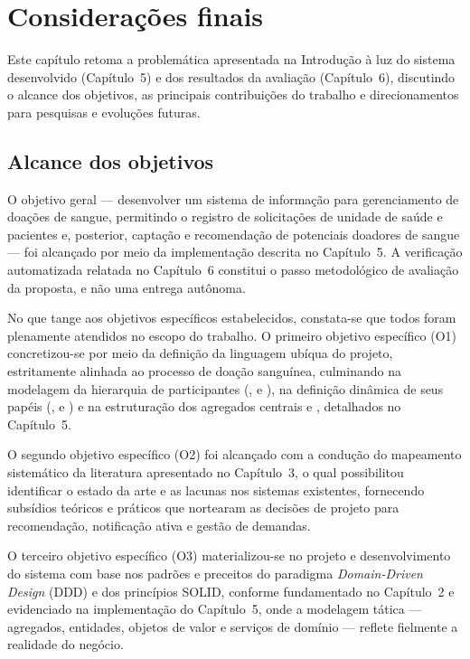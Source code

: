 \chapter{Considerações finais}

Este capítulo retoma a problemática apresentada na Introdução à luz do sistema desenvolvido (Capítulo~5) e dos resultados da avaliação (Capítulo~6), discutindo o alcance dos objetivos, as principais contribuições do trabalho e direcionamentos para pesquisas e evoluções futuras.

\section{Alcance dos objetivos}

O objetivo geral --- desenvolver um sistema de informação para gerenciamento de doações de sangue, permitindo o registro de solicitações de unidade de saúde e pacientes e, posterior, captação e recomendação de potenciais doadores de sangue --- foi alcançado por meio da implementação descrita no Capítulo~5. A verificação automatizada relatada no Capítulo~6 constitui o passo metodológico de avaliação da proposta, e não uma entrega autônoma.

No que tange aos objetivos específicos estabelecidos, constata-se que todos foram plenamente atendidos no escopo do trabalho. O primeiro objetivo específico (O1) concretizou-se por meio da definição da linguagem ubíqua do projeto, estritamente alinhada ao processo de doação sanguínea, culminando na modelagem da hierarquia de participantes (,  e ), na definição dinâmica de seus papéis (,  e ) e na estruturação dos agregados centrais  e , detalhados no Capítulo~5.

O segundo objetivo específico (O2) foi alcançado com a condução do mapeamento sistemático da literatura apresentado no Capítulo~3, o qual possibilitou identificar o estado da arte e as lacunas nos sistemas existentes, fornecendo subsídios teóricos e práticos que nortearam as decisões de projeto para recomendação, notificação ativa e gestão de demandas.

O terceiro objetivo específico (O3) materializou-se no projeto e desenvolvimento do sistema com base nos padrões e preceitos do paradigma \textit{Domain-Driven Design} (DDD) e dos princípios SOLID, conforme fundamentado no Capítulo~2 e evidenciado na implementação do Capítulo~5, onde a modelagem tática --- agregados, entidades, objetos de valor e serviços de domínio --- reflete fielmente a realidade do negócio.

